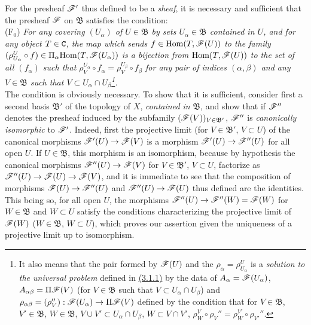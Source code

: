 \begin{env}[3.2.2]
\label{env-0.3.2.2}
For the presheaf $\mathscr{F}'$ thus defined to be a {\em sheaf}, it is necessary
and sufficient that the presheaf $\mathscr{F}$ on $\mathfrak{B}$ satisfies the
condition:\\

(F$_0$) {\em For any covering $(U_\alpha)$ of $U\in\mathfrak{B}$ by sets
        $U_\alpha\in\mathfrak{B}$ contained in $U$, and for any object $T\in\mathtt{C}$,
        the map which sends $f\in{\mathop{\mathrm{Hom}}\nolimits}(T,\mathscr{F}(U))$ to the family
        $(\rho_{U_\alpha}^U\circ f)\in\Pi_\alpha{\mathop{\mathrm{Hom}}\nolimits}(T,\mathscr{F}(U_\alpha))$ is a
        bijection from ${\mathop{\mathrm{Hom}}\nolimits}(T,\mathscr{F}(U))$ to the set of all $(f_\alpha)$ such
        that $\rho_V^{U_\alpha}\circ f_\alpha=\rho_V^{U_\beta}\circ f_\beta$ for
        any pair of indices $(\alpha,\beta)$ and any $V\in\mathfrak{B}$ such
        that $V\subset U_\alpha\cap U_\beta$\footnote{It also means that the
        pair formed by $\mathscr{F}(U)$ and the $\rho_\alpha=\rho_{U_\alpha}^U$ is a
        {\em solution to the universal problem} defined in \hyperref[env-0.3.1.1]{(3.1.1)} by
        the data of $A_\alpha=\mathscr{F}(U_\alpha)$, $A_{\alpha\beta}=\Pi\mathscr{F}(V)$
        (for $V\in\mathfrak{B}$ such that $V\subset U_\alpha\cap U_\beta$) and
        $\rho_{\alpha\beta}=(\rho_V''):\mathscr{F}(U_\alpha)\to\Pi\mathscr{F}(V)$ defined
        by the condition that for $V\in\mathfrak{B}$, $V'\in\mathfrak{B}$,
        $W\in\mathfrak{B}$, $V\cup V'\subset U_\alpha\cap U_\beta$,
        $W\subset V\cap V'$,
        $\rho_W^V\circ\rho_V''=\rho_W^{V'}\circ\rho_{V'}''$.}.}\\

The condition is obviously necessary. To show that it is sufficient, consider
first a second basis $\mathfrak{B}'$ of the topology of $X$, {\em contained in}
$\mathfrak{B}$, and show that if $\mathscr{F}''$ denotes the presheaf induced by the
subfamily $(\mathscr{F}(V))_{V\in\mathfrak{B}'}$, $\mathscr{F}''$ is {\em canonically
isomorphic} to $\mathscr{F}'$. Indeed, first the projective limit (for
$V\in\mathfrak{B}'$, $V\subset U$) of the canonical morphisms
$\mathscr{F}'(U)\to\mathscr{F}(V)$ is a morphism $\mathscr{F}'(U)\to\mathscr{F}''(U)$ for all open
$U$. If $U\in\mathfrak{B}$, this morphism is an isomorphism, because by
hypothesis the canonical morphisms $\mathscr{F}''(U)\to\mathscr{F}(V)$ for
$V\in\mathfrak{B}'$, $V\subset U$, factorize as
$\mathscr{F}''(U)\to\mathscr{F}(U)\to\mathscr{F}(V)$, and it is immediate to see that the
composition of morphisms $\mathscr{F}(U)\to\mathscr{F}''(U)$ and $\mathscr{F}''(U)\to\mathscr{F}(U)$
thus defined are the identities. This being so, for all open $U$, the morphisms
$\mathscr{F}''(U)\to\mathscr{F}''(W)=\mathscr{F}(W)$ for $W\in\mathfrak{B}$ and $W\subset U$
satisfy the conditions characterizing the projective limit of $\mathscr{F}(W)$
($W\in\mathfrak{B}$, $W\subset U$), which proves our assertion given the
uniqueness of a projective limit up to isomorphism.


\end{env}

